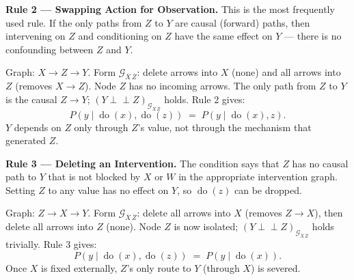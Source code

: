 \documentclass[
  a4paper,
]{book}
\newcounter{none} %
\newcommand{\doop}{\operatorname{do}}
\newcommand{\indep}{\perp\!\!\!\perp}
\newcommand{\Gcal}{\mathcal{G}}
\begin{document}
\textbf{Rule 2 --- Swapping Action for Observation.} This is the most
frequently used rule. If the only paths from \(Z\) to \(Y\) are causal
(forward) paths, then intervening on \(Z\) and conditioning on \(Z\)
have the same effect on \(Y\) --- there is no confounding between \(Z\)
and \(Y\).

\begin{tcolorbox}[enhanced jigsaw, arc=.35mm, bottomrule=.15mm, bottomtitle=1mm, breakable, colback=white, colbacktitle=quarto-callout-note-color!10!white, colframe=quarto-callout-note-color-frame, coltitle=black, left=2mm, leftrule=.75mm, opacityback=0, opacitybacktitle=0.6, rightrule=.15mm, title={Example: Rule 2 --- Action/Observation Exchange}, titlerule=0mm, toprule=.15mm, toptitle=1mm]

Graph: \(X \to Z \to Y\). Form \(\Gcal_{\overline{X}\,\overline{Z}}\):
delete arrows into \(X\) (none) and all arrows into \(Z\) (removes
\(X \to Z\)). Node \(Z\) has no incoming arrows. The only path from
\(Z\) to \(Y\) is the causal \(Z \to Y\);
\((Y \indep Z)_{\Gcal_{\overline{X}\,\overline{Z}}}\) holds. Rule 2
gives: \[P(y \mid \doop(x), \doop(z)) \;=\; P(y \mid \doop(x), z).\]
\(Y\) depends on \(Z\) only through \(Z\)'s value, not through the
mechanism that generated \(Z\).

\end{tcolorbox}

\textbf{Rule 3 --- Deleting an Intervention.} The condition says that
\(Z\) has no causal path to \(Y\) that is not blocked by \(X\) or \(W\)
in the appropriate intervention graph. Setting \(Z\) to any value has no
effect on \(Y\), so \(\doop(z)\) can be dropped.

\begin{tcolorbox}[enhanced jigsaw, arc=.35mm, bottomrule=.15mm, bottomtitle=1mm, breakable, colback=white, colbacktitle=quarto-callout-note-color!10!white, colframe=quarto-callout-note-color-frame, coltitle=black, left=2mm, leftrule=.75mm, opacityback=0, opacitybacktitle=0.6, rightrule=.15mm, title={Example: Rule 3 --- Deleting an Irrelevant Intervention}, titlerule=0mm, toprule=.15mm, toptitle=1mm]

Graph: \(Z \to X \to Y\). Form \(\Gcal_{\overline{X}\,\overline{Z}}\):
delete all arrows into \(X\) (removes \(Z \to X\)), then delete all
arrows into \(Z\) (none). Node \(Z\) is now isolated;
\((Y \indep Z)_{\Gcal_{\overline{X}\,\overline{Z}}}\) holds trivially.
Rule 3 gives: \[P(y \mid \doop(x), \doop(z)) \;=\; P(y \mid \doop(x)).\]
Once \(X\) is fixed externally, \(Z\)'s only route to \(Y\) (through
\(X\)) is severed.

\end{tcolorbox}
\end{document}
